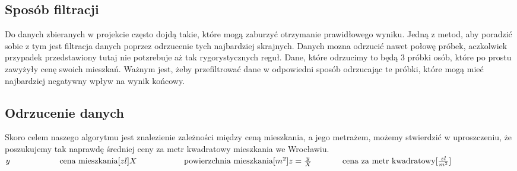	\subsection{Sposób filtracji}
Do danych zbieranych w projekcie często dojdą takie, które mogą zaburzyć otrzymanie prawidłowego wyniku. Jedną z metod, aby poradzić sobie z tym jest filtracja danych poprzez odrzucenie tych najbardziej skrajnych. Danych mozna odrzucić nawet połowę próbek, aczkolwiek przypadek przedstawiony tutaj nie potzrebuje aż tak rygorystycznych reguł. Dane, które odrzucimy to będą 3 próbki osób, które po prostu zawyżyły cenę swoich mieszkań. Ważnym jest, żeby przefiltrować dane w odpowiedni sposób odrzucając te próbki, które mogą mieć najbardziej negatywny wpływ na wynik końcowy.
	\subsection{Odrzucenie danych}
Skoro celem naszego algorytmu jest znalezienie zależności między ceną mieszkania, a jego metrażem, możemy stwierdzić w uproszczeniu, że poszukujemy tak naprawdę średniej ceny za metr kwadratowy mieszkania we Wrocławiu.
\newline
\newline
\noindent
\(
	y  \hspace{2.1cm} \textrm{cena mieszkania} [zl] \\
	X  \hspace{2cm} \textrm{powierzchnia mieszkania} [m^{2}] \\
	z = \frac{y}{X}  \hspace{1.3cm} \textrm{cena za metr kwadratowy} [\frac{zl}{m^{2}}] \\
\)


